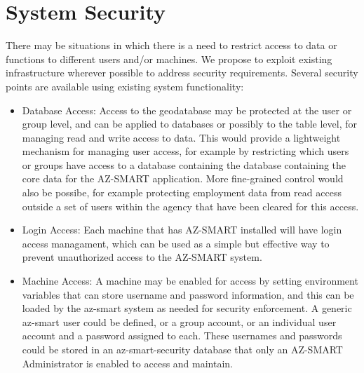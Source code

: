 \section{System Security}
There may be situations in which there is a need to restrict access
to data or functions to different users and/or machines.  We propose
to exploit existing infrastructure wherever possible to address
security requirements.  Several security points are available using
existing system functionality:


\begin{itemize}
\item Database Access: Access to the geodatabase may be protected
at the user or group level, and can be applied to databases or
possibly to the table level, for managing read and write access
to data.  This would provide a lightweight mechanism for managing
user access, for example by restricting which users or groups
have access to a database containing the database containing the
core data for the AZ-SMART application.  More fine-grained control
would also be possibe, for example protecting employment data from
read access outside a set of users within the agency that have
been cleared for this access.

\item Login Access: Each machine that has AZ-SMART installed will
have login access managament, which can be used as a simple but
effective way to prevent unauthorized access to the AZ-SMART system.

\item Machine Access: A machine may be enabled for access by setting
environment variables that can store username and password information,
and this can be loaded by the az-smart system as needed for security
enforcement.  A generic az-smart user could be defined, or a group
account, or an individual user account and a password assigned to
each.  These usernames and passwords could be stored in an
az-smart-security database that only an AZ-SMART Administrator is
enabled to access and maintain.

\end{itemize}
